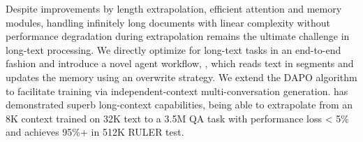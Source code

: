 Despite improvements by length extrapolation, efficient attention and memory modules, handling infinitely long documents with linear complexity without performance degradation during extrapolation remains the ultimate challenge in long-text processing.
We directly optimize for long-text tasks in an end-to-end fashion and introduce a novel agent workflow, \method, which reads text in segments and updates the memory using an overwrite strategy. We extend the DAPO algorithm to facilitate training via independent-context multi-conversation generation. \method has demonstrated superb long-context capabilities, being able to extrapolate from an 8K context trained on 32K text to a 3.5M QA task with performance loss < 5\% and achieves 95\%+ in 512K RULER test.